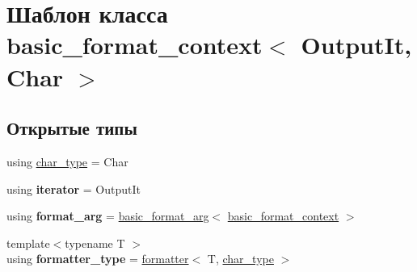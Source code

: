 \hypertarget{classbasic__format__context}{}\section{Шаблон класса basic\+\_\+format\+\_\+context$<$ Output\+It, Char $>$}
\label{classbasic__format__context}
\subsection*{Открытые типы}
\begin{DoxyCompactItemize}
\item 
using \hyperlink{classbasic__format__context_a71fea7d34edb618df612644dfd02a896}{char\+\_\+type} = Char
\item 
\mbox{\label{classbasic__format__context_a4f1162babbfd61a5c35cb441cdafbb1b}} 
using {\bfseries iterator} = Output\+It
\item 
\mbox{\label{classbasic__format__context_a6453d86fefbd8d297e7c19c88dfc22b3}} 
using {\bfseries format\+\_\+arg} = \hyperlink{classbasic__format__arg}{basic\+\_\+format\+\_\+arg}$<$ \hyperlink{classbasic__format__context}{basic\+\_\+format\+\_\+context} $>$
\item 
\mbox{\label{classbasic__format__context_a0dfd33a4158aff7039f722fb18da1bc1}} 
{\footnotesize template$<$typename T $>$ }\\using {\bfseries formatter\+\_\+type} = \hyperlink{structformatter}{formatter}$<$ T, \hyperlink{classbasic__format__context_a71fea7d34edb618df612644dfd02a896}{char\+\_\+type} $>$
\end{DoxyCompactItemize}
